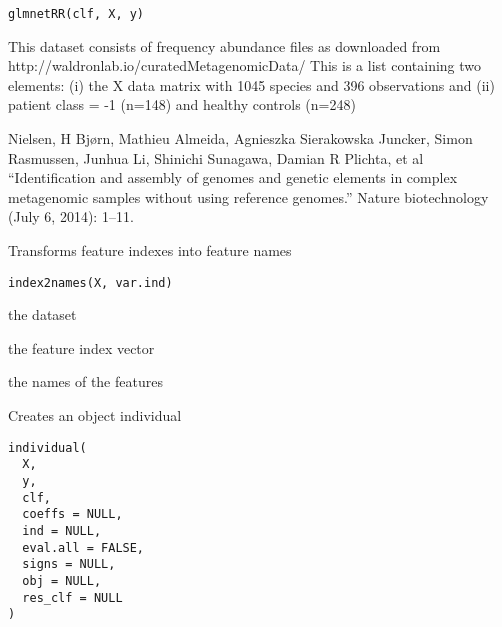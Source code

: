 \documentclass[a4paper]{book}
\begin{document}
%
\begin{Usage}
\begin{verbatim}
glmnetRR(clf, X, y)
\end{verbatim}
\end{Usage}
%
\begin{Description}
This dataset consists of frequency abundance files as downloaded from http://waldronlab.io/curatedMetagenomicData/
This is a list containing two elements: (i) the X data matrix with 1045 species and 396 observations and (ii) patient class = -1 (n=148) and healthy controls (n=248)
\end{Description}
%
\begin{Author}
Nielsen, H Bjørn, Mathieu Almeida, Agnieszka Sierakowska Juncker, Simon Rasmussen, Junhua Li, Shinichi Sunagawa, Damian R Plichta, et al “Identification and assembly of genomes and genetic elements in complex metagenomic samples without using reference genomes.” Nature biotechnology (July 6, 2014): 1–11.
\end{Author}
%
\begin{Description}
Transforms feature indexes into feature names
\end{Description}
%
\begin{Usage}
\begin{verbatim}
index2names(X, var.ind)
\end{verbatim}
\end{Usage}
%
\begin{Arguments}
\begin{ldescription}
\item[\code{X:}] the dataset

\item[\code{var.ind:}] the feature index vector
\end{ldescription}
\end{Arguments}
%
\begin{Value}
the names of the features
\end{Value}
%
\begin{Description}
Creates an object individual
\end{Description}
%
\begin{Usage}
\begin{verbatim}
individual(
  X,
  y,
  clf,
  coeffs = NULL,
  ind = NULL,
  eval.all = FALSE,
  signs = NULL,
  obj = NULL,
  res_clf = NULL
)
\end{verbatim}
\end{Usage}
\end{document}
